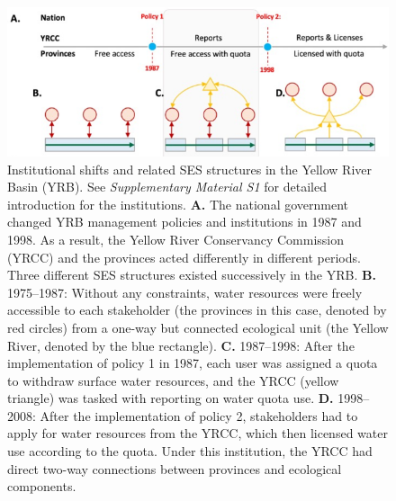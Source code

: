 \documentclass{../nsr}
\begin{document}
\begin{figure}[!ht]
    \centering
    \includegraphics[width=32pc]{diagrams/structure.png}
	\caption{
		Institutional shifts and related SES structures in the Yellow River Basin (YRB). See \textit{Supplementary Material S1} for detailed introduction for the institutions.
		\textbf{A.} The national government changed YRB management policies and institutions in 1987 and 1998. As a result, the Yellow River Conservancy Commission (YRCC) and the provinces acted differently in different periods. Three different SES structures existed successively in the YRB.
		\textbf{B.} 1975–1987: Without any constraints, water resources were freely accessible to each stakeholder (the provinces in this case, denoted by red circles) from a one-way but connected ecological unit (the Yellow River, denoted by the blue rectangle).
		\textbf{C.} 1987–1998: After the implementation of policy 1 in 1987, each user was assigned a quota to withdraw surface water resources, and the YRCC (yellow triangle) was tasked with reporting on water quota use.
		\textbf{D.} 1998–2008: After the implementation of policy 2, stakeholders had to apply for water resources from the YRCC, which then licensed water use according to the quota. Under this institution, the YRCC had direct two-way connections between provinces and ecological components.
	}
	\label{structure}
\end{figure}
\end{document}
